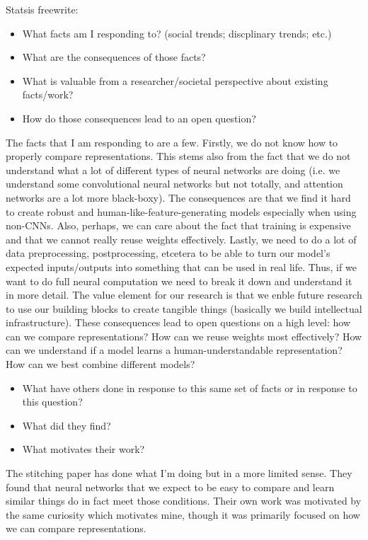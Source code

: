\documentclass{article} %
\begin{document}
Statsis freewrite:
\begin{itemize}
   \item What facts am I responding to? (social trends; discplinary trends; etc.)
   \item What are the consequences of those facts?
   \item What is valuable from a researcher/societal perspective about existing facts/work?
   \item How do those consequences lead to an open question?
\end{itemize}

The facts that I am responding to are a few. Firstly, we do not know how to properly compare representations.
This stems also from the fact that we do not understand what a lot of different types of neural networks are
doing (i.e. we understand some convolutional neural networks but not totally, and attention networks are a lot
more black-boxy). The consequences are that we find it hard to create robust and human-like-feature-generating
models especially when using non-CNNs. Also, perhaps, we can care about the fact that training is expensive and
that we cannot really reuse weights effectively. Lastly, we need to do a lot of data preprocessing, postprocessing,
etcetera to be able to turn our model's expected inputs/outputs into something that can be used in real life. Thus,
if we want to do full neural computation we need to break it down and understand it in more detail. The value
element for our research is that we enble future research to use our building blocks to create tangible things
(basically we build intellectual infrastructure). These consequences lead to open questions on a high level:
how can we compare representations? How can we reuse weights most effectively? How can we understand if a
model learns a human-understandable representation? How can we best combine different models?

\begin{itemize}
   \item What have others done in response to this same set of facts or in response to this question?
   \item What did they find?
   \item What motivates their work?
\end{itemize}

The stitching paper has done what I'm doing but in a more limited sense. They found that neural networks that we expect
to be easy to compare and learn similar things do in fact meet those conditions. Their own work was motivated by the same
curiosity which motivates mine, though it was primarily focused on how we can compare representations.
\end{document}
